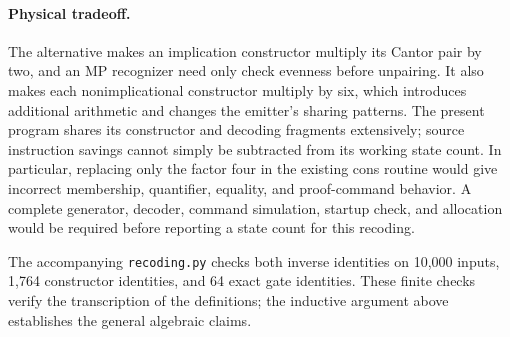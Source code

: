 \paragraph{Physical tradeoff.}
The alternative makes an implication constructor multiply its Cantor pair by
two, and an MP recognizer need only check evenness before unpairing. It also
makes each nonimplicational constructor multiply by six, which introduces
additional arithmetic and changes the emitter's sharing patterns. The
present program shares its constructor and decoding fragments extensively;
source instruction savings cannot simply be subtracted from its working
state count. In particular, replacing only the factor four in the existing
cons routine would give incorrect membership, quantifier, equality, and
proof-command behavior. A complete generator, decoder, command simulation,
startup check, and allocation would be required before reporting a state
count for this recoding.

The accompanying \texttt{recoding.py} checks both inverse identities on
10,000 inputs, 1,764 constructor identities, and 64 exact gate identities.
These finite checks verify the transcription of the definitions; the
inductive argument above establishes the general algebraic claims.
